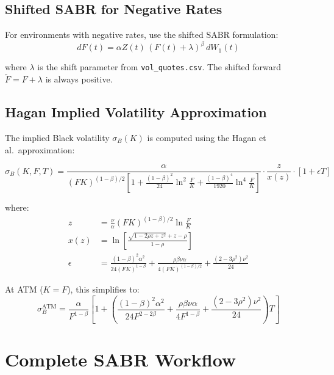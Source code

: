 \documentclass[12pt,a4paper]{report}
\newcommand{\code}[1]{\texttt{#1}}
\begin{document}
\subsection{Shifted SABR for Negative Rates}

For environments with negative rates, use the shifted SABR formulation:
\begin{equation}
    dF(t) = \alpha Z(t) \, (F(t) + \lambda)^\beta \, dW_1(t)
\end{equation}

where $\lambda$ is the shift parameter from \code{vol\_quotes.csv}. The shifted forward $\tilde{F} = F + \lambda$ is always positive.

\subsection{Hagan Implied Volatility Approximation}

The implied Black volatility $\sigma_B(K)$ is computed using the Hagan et al.\ approximation:

\begin{equation}
    \sigma_B(K,F,T) = \frac{\alpha}{(FK)^{(1-\beta)/2} \left[1 + \frac{(1-\beta)^2}{24}\ln^2\frac{F}{K} + \frac{(1-\beta)^4}{1920}\ln^4\frac{F}{K}\right]} \cdot \frac{z}{x(z)} \cdot \left[1 + \epsilon T\right]
\end{equation}

where:
\begin{align}
    z &= \frac{\nu}{\alpha}(FK)^{(1-\beta)/2}\ln\frac{F}{K} \\
    x(z) &= \ln\left[\frac{\sqrt{1-2\rho z + z^2} + z - \rho}{1-\rho}\right] \\
    \epsilon &= \frac{(1-\beta)^2\alpha^2}{24(FK)^{1-\beta}} + \frac{\rho\beta\nu\alpha}{4(FK)^{(1-\beta)/2}} + \frac{(2-3\rho^2)\nu^2}{24}
\end{align}

At ATM ($K=F$), this simplifies to:
\begin{equation}
    \sigma_B^{\text{ATM}} = \frac{\alpha}{F^{1-\beta}}\left[1 + \left(\frac{(1-\beta)^2\alpha^2}{24 F^{2-2\beta}} + \frac{\rho\beta\nu\alpha}{4 F^{1-\beta}} + \frac{(2-3\rho^2)\nu^2}{24}\right)T\right]
\end{equation}

\section{Complete SABR Workflow}
\end{document}
